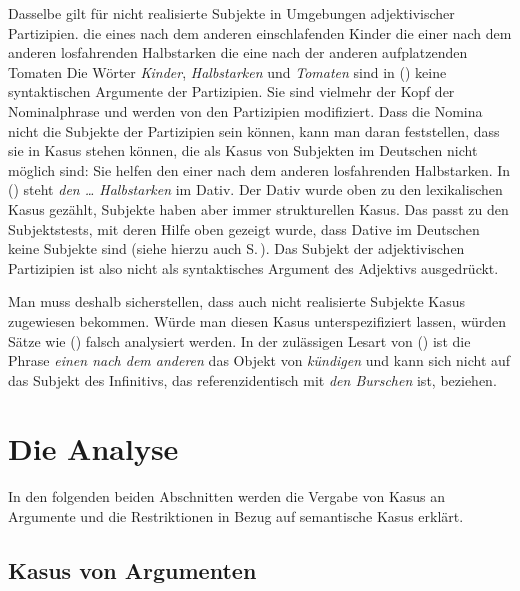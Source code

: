 Dasselbe gilt für nicht realisierte Subjekte in Umgebungen adjektivischer Partizipien.
\eal
\label{bsp-nominativ-adj}
\ex die eines nach dem anderen einschlafenden Kinder
\ex die einer nach dem anderen losfahrenden   Halbstarken
\ex die eine  nach der anderen aufplatzenden  Tomaten
\zl
Die Wörter \emph{Kinder}, \emph{Halbstarken} und \emph{Tomaten} sind in () keine syntaktischen
Argumente der Partizipien. Sie sind vielmehr der Kopf der Nominalphrase und werden von den Partizipien
modifiziert. Dass die Nomina nicht die Subjekte der Partizipien sein können, kann man daran
feststellen, dass sie in Kasus stehen können, die als Kasus von Subjekten im Deutschen nicht möglich sind:
\ea
Sie helfen den einer nach dem anderen losfahrenden Halbstarken.
\z
In () steht \emph{den \ldots{} Halbstarken} im Dativ. Der Dativ wurde oben zu den lexikalischen
Kasus gezählt, Subjekte haben aber immer strukturellen Kasus. Das passt zu den Subjektstests, mit
deren Hilfe oben gezeigt wurde, dass Dative im Deutschen keine Subjekte sind (siehe hierzu auch S.\,\pageref{page-dativsubjekte}).
Das Subjekt der adjektivischen Partizipien ist also nicht als syntaktisches Argument des
Adjektivs ausgedrückt.

Man muss deshalb sicherstellen, dass auch nicht realisierte Subjekte Kasus zugewiesen bekommen.
Würde man diesen Kasus unterspezifiziert lassen, würden Sätze wie () falsch analysiert werden.
\z
In der zulässigen Lesart von () ist die Phrase 
\emph{einen nach dem anderen} das Objekt von \emph{kündigen} und kann
sich nicht auf das Subjekt des Infinitivs, das referenzidentisch
mit \emph{den Burschen} ist, beziehen.



\section{Die Analyse}

In den folgenden beiden Abschnitten werden die Vergabe von Kasus an Argumente und 
die Restriktionen in Bezug auf semantische Kasus erklärt. 


\subsection{Kasus von Argumenten}

